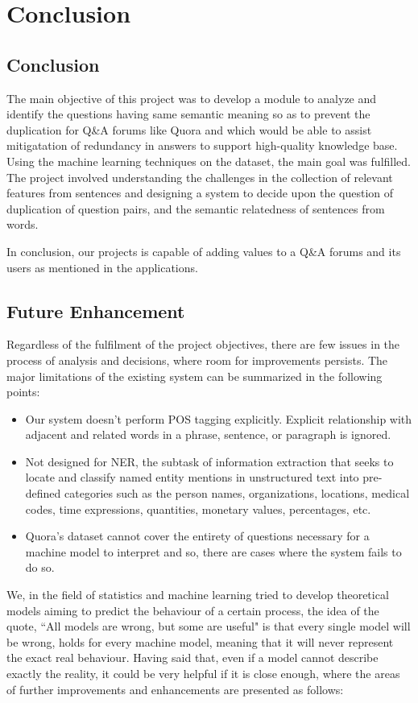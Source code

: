 \chapter{Conclusion}
\section{Conclusion}
The main objective of this project was to develop a module to analyze and identify the questions having same semantic meaning so as to prevent the duplication for Q\&A forums like Quora and which would be able to assist mitigatation of redundancy in answers to support high-quality knowledge base. Using the machine learning techniques on the dataset, the main goal was fulfilled. The project involved understanding the challenges in the collection of relevant features from sentences and designing a system to decide upon the question of duplication of question pairs, and the semantic relatedness of sentences from words.

In conclusion, our projects is capable of adding values to a Q\&A forums and its users as mentioned in the applications.

\section{Future Enhancement}
Regardless of the fulfilment of the project objectives, there are few issues in the process of analysis and decisions, where room for improvements persists. The major limitations of the existing system can be summarized in the following points:

\begin{itemize}
	\item Our system doesn't perform \ac{POS} tagging explicitly. Explicit relationship with adjacent and related words in a phrase, sentence, or paragraph is ignored.
	\item Not designed for \ac{NER}, the subtask of information extraction that seeks to locate and classify named entity mentions in unstructured text into pre-defined categories such as the person names, organizations, locations, medical codes, time expressions, quantities, monetary values, percentages, etc.
	\item Quora's dataset cannot cover the entirety of questions necessary for a machine model to interpret and so, there are cases where the system fails to do so.
\end{itemize}

We, in the field of statistics and machine learning tried to develop theoretical models aiming to predict the behaviour of a certain process, the idea of the quote, ``All models are wrong, but some are useful" is that every single model will be wrong, holds for every machine model, meaning that it will never represent the exact real behaviour. Having said that, even if a model cannot describe exactly the reality, it could be very helpful if it is close enough, where the areas of further improvements and enhancements are presented as follows:

